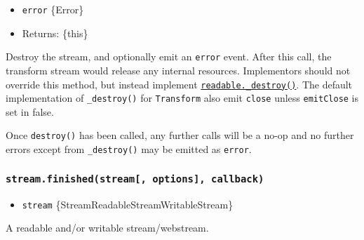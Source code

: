 \begin{itemize}
\tightlist
\item
  \texttt{error} \{Error\}
\item
  Returns: \{this\}
\end{itemize}

Destroy the stream, and optionally emit an
\texttt{\textquotesingle{}error\textquotesingle{}} event. After this
call, the transform stream would release any internal resources.
Implementors should not override this method, but instead implement
\hyperref[readable_destroyerr-callback]{\texttt{readable.\_destroy()}}.
The default implementation of \texttt{\_destroy()} for
\texttt{Transform} also emit
\texttt{\textquotesingle{}close\textquotesingle{}} unless
\texttt{emitClose} is set in false.

Once \texttt{destroy()} has been called, any further calls will be a
no-op and no further errors except from \texttt{\_destroy()} may be
emitted as \texttt{\textquotesingle{}error\textquotesingle{}}.

\subsubsection{\texorpdfstring{\texttt{stream.finished(stream{[},\ options{]},\ callback)}}{stream.finished(stream{[}, options{]}, callback)}}\label{stream.finishedstream-options-callback}

\begin{itemize}
\tightlist
\item
  \texttt{stream}
  \{Stream\textbar ReadableStream\textbar WritableStream\}
\end{itemize}

A readable and/or writable stream/webstream.

